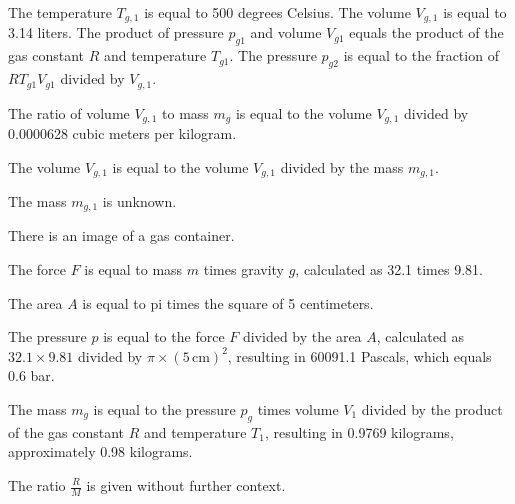 The temperature \( T_{g,1} \) is equal to 500 degrees Celsius.
The volume \( V_{g,1} \) is equal to 3.14 liters.
The product of pressure \( p_{g1} \) and volume \( V_{g1} \) equals the product of the gas constant \( R \) and temperature \( T_{g1} \).
The pressure \( p_{g2} \) is equal to the fraction of \( R T_{g1} V_{g1} \) divided by \( V_{g,1} \).

The ratio of volume \( V_{g,1} \) to mass \( m_{g} \) is equal to the volume \( V_{g,1} \) divided by 0.0000628 cubic meters per kilogram.

The volume \( V_{g,1} \) is equal to the volume \( V_{g,1} \) divided by the mass \( m_{g,1} \).

The mass \( m_{g,1} \) is unknown.

There is an image of a gas container.

The force \( F \) is equal to mass \( m \) times gravity \( g \), calculated as 32.1 times 9.81.

The area \( A \) is equal to pi times the square of 5 centimeters.

The pressure \( p \) is equal to the force \( F \) divided by the area \( A \), calculated as \( 32.1 \times 9.81 \) divided by \( \pi \times (5 \, \text{cm})^2 \), resulting in 60091.1 Pascals, which equals 0.6 bar.

The mass \( m_{g} \) is equal to the pressure \( p_{g} \) times volume \( V_{1} \) divided by the product of the gas constant \( R \) and temperature \( T_{1} \), resulting in 0.9769 kilograms, approximately 0.98 kilograms.

The ratio \( \frac{R}{M} \) is given without further context.